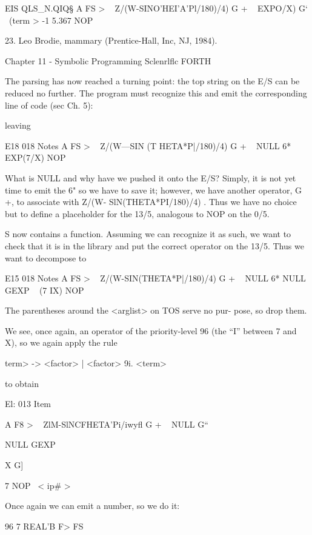  

EIS QLS_N.QIQ§
A FS > \ < subject >
Z/(W-SINO’HEI'A'Pl/180)/4) G + \ < term >
EXPO/X) G‘ \ (term >
-1 5.367 NOP

 

23. Leo Brodie, mammary (Prentice-Hall, Inc, NJ, 1984).

Chapter 11 - Symbolic Programming Sclenrlﬂc FORTH

The parsing has now reached a turning point: the top string on
the E/S can be reduced no further. The program must recognize
this and emit the corresponding line of code (sec Ch. 5):


 

leaving

E18 018 Notes
A FS > \ < subject >
Z/(W—SIN (T HETA*P|/180)/4) G + \ < term >
NULL 6*
EXP(7/X) NOP \ < function >

What is NULL and why have we pushed it onto the E/S? Simply,
it is not yet time to emit the 6" so we have to save it; however,
we have another operator, G +, to associate with Z/(W-
SlN(THETA*PI/180)/4) . Thus we have no choice but to deﬁne a
placeholder for the 13/5, analogous to NOP on the 0/5.

S now contains a function. Assuming we can recognize it as
such, we want to check that it is in the library and put the
correct operator on the 13/5. Thus we want to decompose to

 

E15 018 Notes
A FS > \ < subject >
Z/(W-SIN(THETA*P|/180)/4) G + \ < term >
NULL 6*
NULL GEXP \ < function >
(7 IX) NOP \ < arglist >

The parentheses around the <arglist> on TOS serve no pur-
pose, so drop them.

We see, once again, an operator of the priority-level 96 (the “I”
between 7 and X), so we again apply the rule

\<term> -> <factor> | <factor> 9i. <term>

to obtain

El: 013 Item

A F8 > \ < subject >
ZlM-SlNCFHETA'Pi/iwyﬂ G + \ < term >
NULL G“

NULL GEXP

X G] \ < id >

7 NOP \ < ip# >

Once again we can emit a number, so we do it:

96 7 REAL'B F> FS

